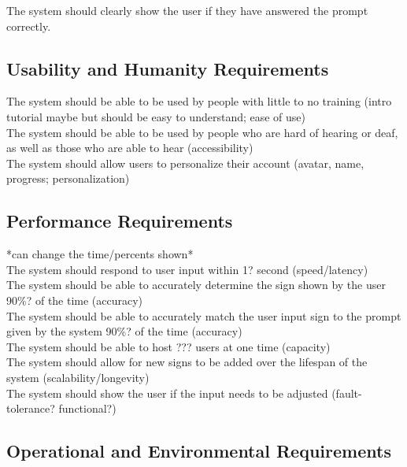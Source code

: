 \documentclass[12pt, titlepage]{article}
\begin{document}
The system should clearly show the user if they have answered the prompt correctly. \\

\subsection{Usability and Humanity Requirements}

The system should be able to be used by people with little to no training (intro tutorial maybe but should be easy to understand; ease of use) \\

The system should be able to be used by people who are hard of hearing or deaf, as well as those who are able to hear (accessibility) \\

The system should allow users to personalize their account (avatar, name, progress; personalization) \\

\subsection{Performance Requirements}

*can change the time/percents shown* \\ 

The system should respond to user input within 1? second (speed/latency) \\

The system should be able to accurately determine the sign shown by the user 90\%? of the time (accuracy) \\ 

The system should be able to accurately match the user input sign to the prompt given by the system 90\%? of the time (accuracy) \\

The system should be able to host ??? users at one time (capacity) \\

The system should allow for new signs to be added over the lifespan of the system (scalability/longevity) \\

The system should show the user if the input needs to be adjusted (fault-tolerance? functional?) \\

\subsection{Operational and Environmental Requirements}
\end{document}
